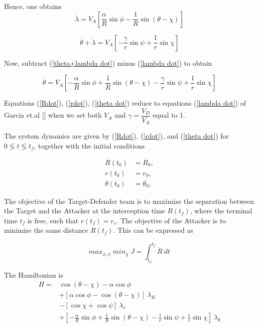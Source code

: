 Hence, one obtains 
\begin{equation}
\dot{\lambda} = V_A [\dfrac{\alpha}{R} \sin \phi - \dfrac{1}{R} \sin (\theta - \chi)]
\label{lambda dot}
\end{equation}

\begin{equation}
\dot{\theta} + \dot{\lambda} = V_A [-\dfrac{\gamma}{r}\sin \psi + \dfrac{1}{r} \sin \chi]
\label{theta+lambda dot}
\end{equation}

Now, subtract (\ref{theta+lambda dot}) minus (\ref{lambda dot}) to obtain

\begin{equation}
\dot{\theta} = V_A [- \dfrac{\alpha}{R} \sin \phi + \dfrac{1}{R} \sin(\theta - \chi) - \dfrac{\gamma}{r} \sin \psi + \dfrac{1}{r}\sin \chi]
\label{theta dot}
\end{equation} 

Equations (\ref{Rdot}), (\ref{rdot}), (\ref{theta dot}) reduce to equations (\ref{lambda dot}) of Garcia et.al [] when we set both $V_A$ and $\gamma=\dfrac{V_D}{V_A}$ equal to 1. 

The system dynamics are given by (\ref{Rdot}), (\ref{rdot}), and (\ref{theta dot}) for $0\lessgtr t \lessgtr t_f$, together with the initial conditions 

\begin{equation*}
	\begin{split}
		R(t_0)&=R_0,\\
		r(t_0)&= r_0,\\
		\theta(t_0)&=\theta_0,
	\end{split}
\end{equation*}

The objective of the Target-Defender team is to maximize
the separation between the Target and the Attacker at the
interception time $R(t_f)$, where the terminal time $t_f$ is free,
such that $r(t_f) = r_c$. The objective of the Attacker is to
minimize the same distance $R(t_f)$. This can be expressed as

\begin{equation*}
max_{\phi,\psi}\ min_\chi\ J= \int_{t_0}^{t_f} \dot{R}\ dt
\end{equation*}

The Hamiltonian is
\begin{equation}
	\begin{split}
	H = & \cos(\theta - \chi) - \alpha \cos \phi \\
	& + [\alpha \cos \phi  - \cos (\theta - \chi)]\ \lambda_R \\
	& - [\cos\chi + \cos\psi]\ \lambda_r \\
	& + [-\frac{\alpha}{R}\sin\phi 
	+\frac{1}{R}\sin(\theta - \chi )
	-\frac{1}{r} \sin \psi
	+\frac{1}{r} \sin \chi]\ \lambda_\theta
	\end{split}
	\label{Hamiltonian}
\end{equation}


